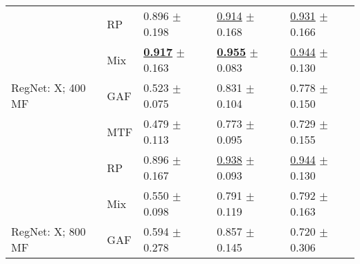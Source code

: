 \begin{tabular}[t]{lllll}
 & RP & \textcolor[rgb]{0.0404411765,0.5000000000,0}{0.896} $\pm$ \textcolor[rgb]{0.7085309655,0.2914690345,0}{0.198} & \underline{\textcolor[rgb]{0.1367861886,0.5000000000,0}{0.914}} $\pm$ \textcolor[rgb]{0.6005700209,0.3994299791,0}{0.168} & \underline{\textcolor[rgb]{0.1217277487,0.5000000000,0}{0.931}} $\pm$ \textcolor[rgb]{0.3194008772,0.5000000000,0}{0.166} \\
 & Mix & \underline{\textbf{\textcolor[rgb]{0.0000000000,0.5000000000,0}{0.917}}} $\pm$ \textcolor[rgb]{0.5819876952,0.4180123048,0}{0.163} & \underline{\textbf{\textcolor[rgb]{0.0000000000,0.5000000000,0}{0.955}}} $\pm$ \textcolor[rgb]{0.1234823448,0.5000000000,0}{0.083} & \underline{\textcolor[rgb]{0.0785340314,0.5000000000,0}{0.944}} $\pm$ \textcolor[rgb]{0.1425478198,0.5000000000,0}{0.130} \\
RegNet: X; 400 MF & GAF & \textcolor[rgb]{0.7647058824,0.2352941176,0}{0.523} $\pm$ \textcolor[rgb]{0.2694079530,0.5000000000,0}{0.075} & \textcolor[rgb]{0.4152279770,0.5000000000,0}{0.831} $\pm$ \textcolor[rgb]{0.2410479020,0.5000000000,0}{0.104} & \textcolor[rgb]{0.5968586387,0.4031413613,0}{0.778} $\pm$ \textcolor[rgb]{0.2423763759,0.5000000000,0}{0.150} \\
 & MTF & \textcolor[rgb]{0.8492647059,0.1507352941,0}{0.479} $\pm$ \textcolor[rgb]{0.4041119296,0.5000000000,0}{0.113} & \textcolor[rgb]{0.6082337317,0.3917662683,0}{0.773} $\pm$ \textcolor[rgb]{0.1915429563,0.5000000000,0}{0.095} & \textcolor[rgb]{0.7480366492,0.2519633508,0}{0.729} $\pm$ \textcolor[rgb]{0.2675465965,0.5000000000,0}{0.155} \\
 & RP & \textcolor[rgb]{0.0404411765,0.5000000000,0}{0.896} $\pm$ \textcolor[rgb]{0.5973732826,0.4026267174,0}{0.167} & \underline{\textcolor[rgb]{0.0557768924,0.5000000000,0}{0.938}} $\pm$ \textcolor[rgb]{0.1771602221,0.5000000000,0}{0.093} & \underline{\textcolor[rgb]{0.0785340314,0.5000000000,0}{0.944}} $\pm$ \textcolor[rgb]{0.1425478198,0.5000000000,0}{0.130} \\
 & Mix & \textcolor[rgb]{0.7117647059,0.2882352941,0}{0.550} $\pm$ \textcolor[rgb]{0.3491926171,0.5000000000,0}{0.098} & \textcolor[rgb]{0.5482071713,0.4517928287,0}{0.791} $\pm$ \textcolor[rgb]{0.3220066784,0.5000000000,0}{0.119} & \textcolor[rgb]{0.5536649215,0.4463350785,0}{0.792} $\pm$ \textcolor[rgb]{0.3053798208,0.5000000000,0}{0.163} \\
RegNet: X; 800 MF & GAF & \textcolor[rgb]{0.6264705882,0.3735294118,0}{0.594} $\pm$ \textcolor[rgb]{0.9922278614,0.0077721386,0}{0.278} & \textcolor[rgb]{0.3266932271,0.5000000000,0}{0.857} $\pm$ \textcolor[rgb]{0.4722563182,0.5000000000,0}{0.145} & \textcolor[rgb]{0.7774869110,0.2225130890,0}{0.720} $\pm$ \textcolor[rgb]{1.0000000000,0.0000000000,0}{0.306} \\

\end{tabular}
